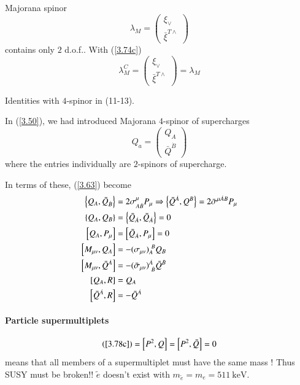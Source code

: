 Majorana spinor
\begin{equation}
   \lambda_M = \begin{pmatrix} \xi_\vee \\ \bar \xi^{T \wedge} \end{pmatrix} \label{3.76}
\end{equation}
contains only $2$ d.o.f..
With (\ref{3.74c}) 
\begin{equation*}
   \lambda_M^C = \begin{pmatrix} \xi_\vee \\ \bar\xi^{T\wedge}\end{pmatrix} = \lambda_M
\end{equation*}

Identities with $4$-spinor in \cite{drees_id} (11-13).

In (\ref{3.50}), we had introduced Majorana $4$-spinor of supercharges
\begin{equation}
   Q_a = \begin{pmatrix} Q_A \\ {\bar{Q}}^{\dot{B}} \end{pmatrix} \label{3.77}
\end{equation}
where the entries individually are $2$-spinors of supercharge. 

In terms of these, (\ref{3.63}) become
\begin{subequations}
   \label{3.78}
  \begin{align}
  \acomm{Q_A}{{\bar{Q}}_{\dot{B}}} &= 2 \sigma^\mu_{A \dot{B}} P_\mu  \Rightarrow \acomm{ {\bar{Q}}^{\dot{A}} }{Q^B} = 2 {\bar{\sigma}}^{\mu \dot{A} B} P_\mu \label{3.78a} \\
  \acomm{Q_A}{Q_B} &= \acomm{{\bar{Q}}_{\dot{A}}}{{\bar Q}_{\dot{A}}} = 0 \label{3.78b} \\
  \comm{Q_A}{P_\mu} &= \comm{{\bar{Q}}_{\dot{A}}}{P_\mu} = 0 \label{3.78c} \\
     \comm{M_{\mu\nu}}{Q_A}  &= - (\sigma_{\mu\nu})_A^{\ B} Q_B \label{3.78d} \\
     \comm{M_{\mu\nu}}{{\bar{Q}}^{\dot{A}}} &= - ({\bar{\sigma}}_{\mu\nu})^{\dot{A}}_{\ \dot{B}} \bar{Q}^{\dot{B}} \label{3.78e} \\
     \comm{Q_A}{R} &= Q_A \label{3.78f} \\
     \comm{{\bar{Q}}^{\dot{A}}}{R} &= - {\bar{Q}}^{\dot{A}} \label{3.78g}
   \end{align} 
\end{subequations}

\paragraph{Particle supermultiplets}
\begin{equation*}
   (\ref{3.78c}) = \comm{P^2}{Q} = \comm{P^2}{\bar Q} = 0 \label{3.79}
\end{equation*}
means that all members of a supermultiplet must have the same mass ! Thus SUSY must be broken!! $\tilde e$ doesn't exist with $m_{\tilde{e}} = m_e = \SI{511}{\kilo\eV}$.


